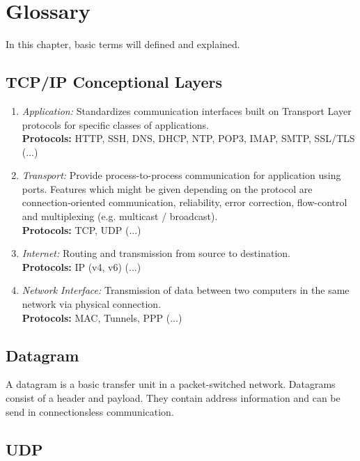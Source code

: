 \section{Glossary}

In this chapter, basic terms will defined and explained.

\subsection{TCP/IP Conceptional Layers}

\begin{enumerate}
      \item \textit{Application:} Standardizes communication interfaces built on Transport Layer protocols for specific classes of applications.\\
            \textbf{Protocols:} \ac{HTTP}, \ac{SSH}, \ac{DNS}, \ac{DHCP}, \ac{NTP}, \ac{POP3}, \ac{IMAP}, \ac{SMTP}, \ac{SSL}/\ac{TLS} (...)
      \item \textit{Transport:} Provide process-to-process communication for application using ports. Features which might be given depending on the protocol are connection-oriented communication, reliability, error correction, flow-control and multiplexing (e.g. multicast / broadcast).\\
            \textbf{Protocols:} \ac{TCP}, \ac{UDP} (...)
      \item \textit{Internet:} Routing and transmission from source to destination.\\
            \textbf{Protocols:} \ac{IP} (v4, v6) (...)
      \item \textit{Network Interface:} Transmission of data between two computers in the same network via physical connection.\\
            \textbf{Protocols:} \ac{MAC}, Tunnels, \ac{PPP} (...)
\end{enumerate}

\subsection{Datagram}

A datagram is a basic transfer unit in a packet-switched network. Datagrams consist of a header and payload. They contain address information and can be send in connectionsless communication.

\subsection{UDP}

